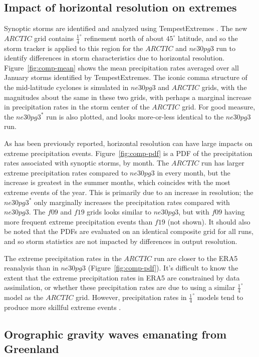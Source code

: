 \documentclass[draft]{agujournal2019}
\begin{document}
\subsection{Impact of horizontal resolution on extremes}
Synoptic storms are identified and analyzed using TempestExtremes \cite{UETAL2021}. The new $ARCTIC$ grid contains $\frac{1}{4}^{\circ}$ refinement north of about $45^{\circ}$ latitude, and so the storm tracker is applied to this region for the $ARCTIC$ and $ne30pg3$ run to identify differences in storm characteristics due to horizontal resolution. Figure~\ref{fig:comp-mean} shows the mean precipitation rates averaged over all January storms identified by TempestExtremes. The iconic comma structure of the mid-latitude cyclones is simulated in $ne30pg3$ and $ARCTIC$ grids, with the magnitudes about the same in these two grids, with perhaps a marginal increase in precipitation rates in the storm center of the $ARCTIC$ grid. For good measure, the $ne30pg3^{*}$ run is also plotted, and looks more-or-less identical to the $ne30pg3$ run.

As has been previously reported, horizontal resolution can have large impacts on extreme precipitation events. Figure~\ref{fig:comp-pdf} is a PDF of the precipitation rates associated with synoptic storms, by month. The $ARCTIC$ run has larger extreme precipitation rates compared to $ne30pg3$ in every month, but the increase is greatest in the summer months, which coincides with the most extreme events of the year. This is primarily due to an increase in resolution; the $ne30pg3^{*}$ only marginally increases the precipitation rates compared with $ne30pg3$. The $f09$ and $f19$ grids looks similar to $ne30pg3$, but with $f09$ having more frequent extreme precipitation events than $f19$ (not shown). It should also be noted that the PDFs are evaluated on an identical composite grid for all runs, and so storm statistics are not impacted by differences in output resolution.

The extreme precipitation rates in the $ARCTIC$ run are closer to the ERA5 reanalysis than in $ne30pg3$ (Figure~\ref{fig:comp-pdf}). It's difficult to know the extent that the extreme precipitation rates in ERA5 are constrained by data assimilation, or whether these precipitation rates are due to using a similar $\frac{1}{4}^{\circ}$ model as the $ARCTIC$ grid. However, precipitation rates in $\frac{1}{4}^{\circ}$ models tend to produce more skillful extreme events \cite{OETAL2016JAMES}. 

\subsection{Orographic gravity waves emanating from Greenland}
\end{document}
